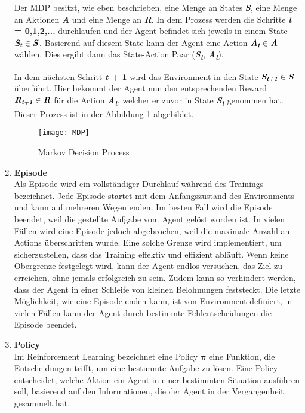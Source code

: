 \begin{enumerate}
    Der MDP besitzt, wie eben beschrieben, eine Menge an States \textbf{\textit{S}}, eine Menge an Aktionen \textbf{\textit{A}} und eine Menge an \textbf{\textit{R}}.
    In dem Prozess werden die Schritte \textbf{\textit{t} = 0,1,2,...} durchlaufen und der Agent befindet sich jeweils in einem State $ \text{\textbf{\textit{S\textsubscript{t}}}}\in \text{\textbf{\textit{S}}}$. 
    Basierend auf diesem State kann der Agent eine Action $ \text{\textbf{\textit{A\textsubscript{t}}}}\in \text{\textbf{\textit{A}}}$ wählen. Dies ergibt dann das State-Action Paar (\textbf{\textit{S\textsubscript{t}}}, \textbf{\textit{A\textsubscript{t}}}).

    In dem nächsten Schritt \textbf{\textit{t} + 1} wird das Environment in den State $ \text{\textbf{\textit{S\textsubscript{t+1}}}}\in \text{\textbf{\textit{S}}}$ überführt.
    Hier bekommt der Agent nun den entsprechenden Reward $ \text{\textbf{\textit{R\textsubscript{t+1}}}}\in \text{\textbf{\textit{R}}}$ für die Action \textbf{\textit{A\textsubscript{t}}},
    welcher er zuvor in State \textbf{\textit{S\textsubscript{t}}} genommen hat. Dieser Prozess ist in der Abbildung \ref{MDP} abgebildet.


    \begin{figure}
        \texttt{[image: MDP]}
        \caption{Markov Decision Process}
        \label{MDP}
    \end{figure}
    \item \label{itm:Episode} \textbf{Episode} \\
    Als Episode wird ein vollständiger Durchlauf während des Trainings bezeichnet. Jede Episode startet mit dem Anfangszustand des Environments und kann auf mehreren Wegen enden. Im besten Fall wird die Episode beendet, weil die gestellte Aufgabe vom Agent gelöst worden ist. In vielen Fällen wird eine Episode jedoch abgebrochen, weil die maximale Anzahl an Actions überschritten wurde. Eine solche Grenze wird implementiert, um sicherzustellen, dass das Training effektiv und effizient abläuft. Wenn keine Obergrenze festgelegt wird, kann der Agent endlos versuchen, das Ziel zu erreichen, ohne jemals erfolgreich zu sein. Zudem kann so verhindert werden, dass der Agent in einer Schleife von kleinen Belohnungen feststeckt. Die letzte Möglichkeit, wie eine Episode enden kann, ist von Environment definiert, in vielen Fällen kann der Agent durch bestimmte Fehlentscheidungen die Episode beendet.
    
    \item \textbf{Policy}\\
    Im Reinforcement Learning bezeichnet eine Policy {$\bm{\pi}$} eine Funktion, die Entscheidungen trifft, um eine bestimmte Aufgabe zu lösen. Eine Policy entscheidet, welche Aktion ein Agent in einer bestimmten Situation ausführen soll, basierend auf den Informationen, die der Agent in der Vergangenheit gesammelt hat.


\end{enumerate}
